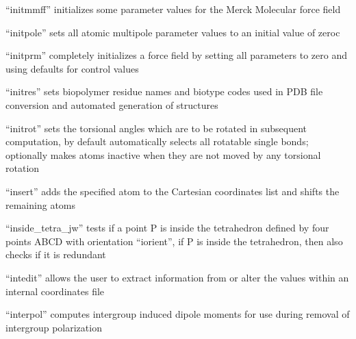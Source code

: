 \documentclass[letterpaper,11pt,english]{sphinxmanual}
\begin{document}
\sphinxAtStartPar
{}

\sphinxAtStartPar
“initmmff” initializes some parameter values for the Merck Molecular force field

\sphinxAtStartPar
{}

\sphinxAtStartPar
“initpole” sets all atomic multipole parameter values to an initial value of zeroc

\sphinxAtStartPar
{}

\sphinxAtStartPar
“initprm” completely initializes a force field by setting all parameters to zero and using defaults for control values

\sphinxAtStartPar
{}

\sphinxAtStartPar
“initres” sets biopolymer residue names and biotype codes used in PDB file conversion and automated generation of structures

\sphinxAtStartPar
{}

\sphinxAtStartPar
“initrot” sets the torsional angles which are to be rotated in subsequent computation, by default automatically selects all rotatable single bonds; optionally makes atoms inactive when they are not moved by any torsional rotation

\sphinxAtStartPar
{}

\sphinxAtStartPar
“insert” adds the specified atom to the Cartesian coordinates list and shifts the remaining atoms

\sphinxAtStartPar
{}

\sphinxAtStartPar
“inside\_tetra\_jw” tests if a point P is inside the tetrahedron defined by four points ABCD with orientation “iorient”, if P is inside the tetrahedron, then also checks if it is redundant

\sphinxAtStartPar
{}

\sphinxAtStartPar
“intedit” allows the user to extract information from or alter the values within an internal coordinates file

\sphinxAtStartPar
{}

\sphinxAtStartPar
“interpol” computes intergroup induced dipole moments for use during removal of intergroup polarization

\sphinxAtStartPar
{}
\end{document}
